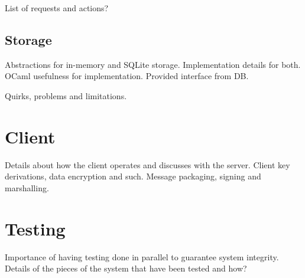List of requests and actions?

\subsection{Storage}
Abstractions for in-memory and SQLite storage.
Implementation details for both.
OCaml usefulness for implementation.
Provided interface from DB.

Quirks, problems and limitations.

\section{Client}
Details about how the client operates and discusses with the server.
Client key derivations, data encryption and such.
Message packaging, signing and marshalling.

\section{Testing}
Importance of having testing done in parallel to guarantee system integrity.
Details of the pieces of the system that have been tested and how?
